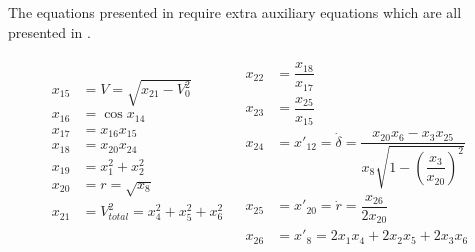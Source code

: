 %
%
%
%
%

The equations presented in  require extra auxiliary equations which are all presented in .
 
 \begin{align} \label{eq:extraTransAnglAux}
\begin{split}
x_{15} &= V = \sqrt{x_{21}-V_{0}^{2}} \\
x_{16} &= \cos x_{14}\\
x_{17} &= x_{16}x_{15}\\
x_{18} &= x_{20}x_{24}\\
x_{19} &= x_{1}^{2}+x_{2}^{2}\\
x_{20} &= r = \sqrt{x_{8}} \\
x_{21} &= V_{total}^{2} =  x_{4}^{2}+x_{5}^{2}+x_{6}^{2}\\
\end{split}
&
\begin{split}
x_{22} &= \dfrac{x_{18}}{x_{17}}\\
x_{23} &= \dfrac{x_{25}}{x_{15}}\\
x_{24} &= x'_{12} = \dot{\delta} = \dfrac{x_{20}x_{6}-x_{3}x_{25}}{x_{8} \sqrt{1-\left(\dfrac{x_{3}}{x_{20}}\right)^{2}}}\\
x_{25} &= x'_{20}=\dot{r}=\dfrac{x_{26}}{2x_{20}}\\
x_{26} &= x'_{8}=2x_{1}x_{4}+2x_{2}x_{5}+2x_{3}x_{6}
\end{split}
\end{align}  

